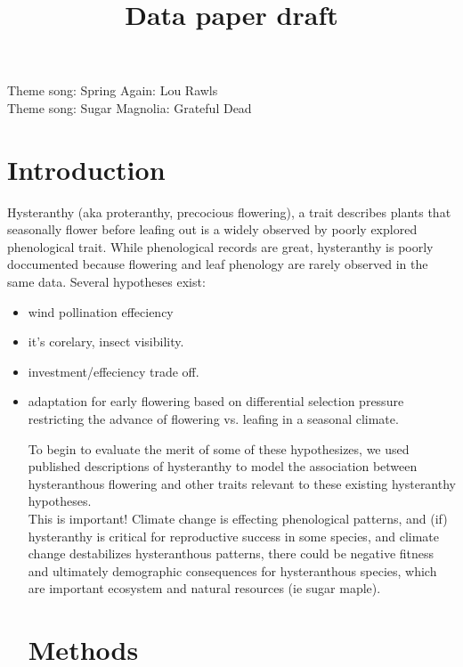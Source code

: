\documentclass{article}\usepackage[]{graphicx}\usepackage[]{color}
\begin{document}
\title{Data paper draft}
Theme song: Spring Again: Lou Rawls\\
Theme song: Sugar Magnolia: Grateful Dead\\
\section*{Introduction}
Hysteranthy (aka proteranthy, precocious flowering), a trait describes plants that seasonally flower before leafing out is a widely observed by poorly explored phenological trait. While phenological records are great, hysteranthy is poorly doccumented because flowering and leaf phenology are rarely observed in the same data. Several hypotheses exist:
\begin{itemize}
\item wind pollination effeciency 
\item it's corelary, insect visibility.
\item investment/effeciency trade off.
\item adaptation for early flowering based on differential selection pressure restricting the advance of flowering vs. leafing in a seasonal climate.


To begin to evaluate the merit of some of these hypothesizes, we used published descriptions of hysteranthy to model the association between hysteranthous flowering and other traits relevant to these existing hysteranthy hypotheses.\\
This is important! Climate change is effecting phenological patterns, and (if) hysteranthy is critical for reproductive success in some species, and climate change destabilizes hysteranthous patterns, there could be negative fitness and ultimately demographic consequences for hysteranthous species, which are important ecosystem and natural resources (ie sugar maple).

\section*{Methods}

\end{itemize}
\end{document}
